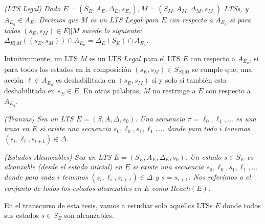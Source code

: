 \begin{nahaDef}
    \emph{(LTS Legal) Dado $E = (S_E, A_E, \Delta_E, s_{E_0}), M = (S_M, A_M, \Delta_M, s_{M_0})$ LTSs, y $A_{E_u} \in
    A_E$. Decimos que $M$ es un LTS $Legal$ para $E$ con respecto a $A_{E_u}$ si para todos $(s_E,s_M) \in E||M$ sucede
    lo siguiente: $\Delta_{E||M}((s_E,s_M)) \cap A_{E_u} = \Delta_E(S_E) \cap A_{E_u}$.}
\end{nahaDef} 

Intuitivamente, un LTS $M$ es un LTS $Legal$ para el LTS $E$ con respecto a $A_{E_u}$, si para todos los estados en la
composición $(s_E,s_M) \in S_{S||M}$ se cumple que, una acción $\ell \in A_{E_u}$ es deshabilitada en $(s_E,s_M)$ si y solo
si también esta deshabilitada en $s_E \in E$. En otras palabras, $M$ no restringe a $E$ con respecto a $A_{E_u}$.


\begin{nahaDef}
    \emph{(Tranzas) Sea un LTS $E = (S,A,\Delta,s_0)$. Una secuencia $\pi = \ell_0,\ell_1,...$ es una traza en $E$ si existe una
    secuencia $s_0,\ell_0,s_1,\ell_1,...$ donde para todo $i$ tenemos $(s_i,\ell_i,s_{i+1}) \in \Delta$.}
\end{nahaDef} 


\begin{nahaDef}
    \emph{(Estados Alcanzables) Sea un LTS $E = (S_E, A_E, \Delta_E, s_0)$. Un estado $s \in S_E$ es alcanzable (desde
    el estado inicial) en $E$ si existe una secuencia $s_0,\ell_0,s_1,\ell_1,...$ donde para cada $i$ tenemos
    $(s_i,\ell_i,s_{i+1}) \in \Delta$ y $s = s_{i+1}$. Nos referimos a el conjunto de todos los estados alcanzables en $E$
    como $Reach(E)$.}
\end{nahaDef} 

En el transcurso de esta tesis, vamos a estudiar solo aquellos LTSs $E$ donde todos sus estados $s \in S_E$ son
alcanzables.
